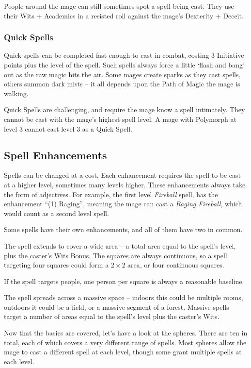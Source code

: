 \begin{multicols}{2}
People around the mage can still sometimes spot a spell being cast. They use their Wits + Academics in a resisted roll against the mage's Dexterity + Deceit.

\subsubsection{Quick Spells}

Quick spells can be completed fast enough to cast in combat, costing 3 Initiative points plus the level of the spell.
Such spells always force a little `flash and bang' out as the raw magic hits the air.
Some mages create sparks as they cast spells, others summon dark mists -- it all depends upon the Path of Magic the mage is walking.

Quick Spells are challenging, and require the mage know a spell intimately.  They cannot be cast with the mage's highest spell level.  A mage with Polymorph at level 3 cannot cast level 3 as a Quick Spell.

\subsection{Spell Enhancements}

Spells can be changed at a cost.
Each enhancement requires the spell to be cast at a higher level, sometimes many levels higher.
These enhancements always take the form of adjectives.
For example, the first level \textit{Fireball} spell, has the enhancement ``(1) Raging'', meaning the mage can cast a \textit{Raging Fireball}, which would count as a second level spell.

Some spells have their own enhancements, and all of them have two in common.

The spell extends to cover a wide area -- a total area equal to the spell's level, plus the caster's Wits Bonus.
The squares are always continuous, so a spell targeting four squares could form a $2\times 2$ area, or four continuous squares.

If the spell targets people, one person per square is always a reasonable baseline.


The spell spreads across a massive space -- indoors this could be multiple rooms, outdoors it could be a field, or a massive segment of a forest.
Massive spells target a number of areas equal to the spell's level plus the caster's Wits.

\vspace{.3in} 

\noindent Now that the basics are covered, let's have a look at the \glspl{sphere}. There are ten in total, each of which covers a very different range of spells. Most \glspl{sphere} allow the mage to cast a different spell at each level, though some grant multiple spells at each level.

\end{multicols}


